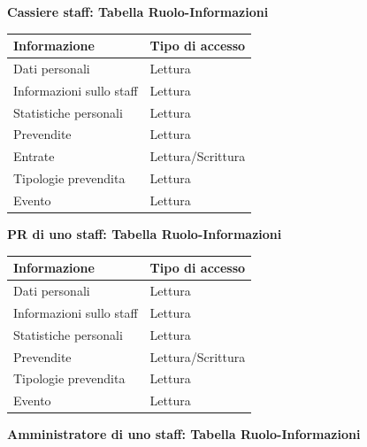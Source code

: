 \documentclass[a4paper]{article}
\begin{document}
\textbf{Cassiere staff: Tabella Ruolo-Informazioni}

\begin{center}
    \begin{tabularx}{1\textwidth}{|X|X|}
    \hline
    \textbf{Informazione} & \textbf{Tipo di accesso} \\
    \hline
    \hline
    Dati personali & Lettura\\
    \hline
    Informazioni sullo staff & Lettura\\
    \hline
    Statistiche personali & Lettura\\
    \hline
    Prevendite & Lettura\\
    \hline
    Entrate & Lettura/Scrittura\\
    \hline
    Tipologie prevendita & Lettura\\
    \hline
    Evento & Lettura\\
    \hline
    \end{tabularx}
\end{center}

\textbf{PR di uno staff: Tabella Ruolo-Informazioni}

\begin{center}
    \begin{tabularx}{1\textwidth}{|X|X|}
    \hline
    \textbf{Informazione} & \textbf{Tipo di accesso} \\
    \hline
    \hline
    Dati personali & Lettura\\
    \hline
    Informazioni sullo staff & Lettura\\
    \hline
    Statistiche personali & Lettura\\
    \hline
    Prevendite & Lettura/Scrittura\\
    \hline
    Tipologie prevendita & Lettura\\
    \hline
    Evento & Lettura\\
    \hline
    \end{tabularx}
\end{center}

\textbf{Amministratore di uno staff: Tabella Ruolo-Informazioni}
\end{document}

